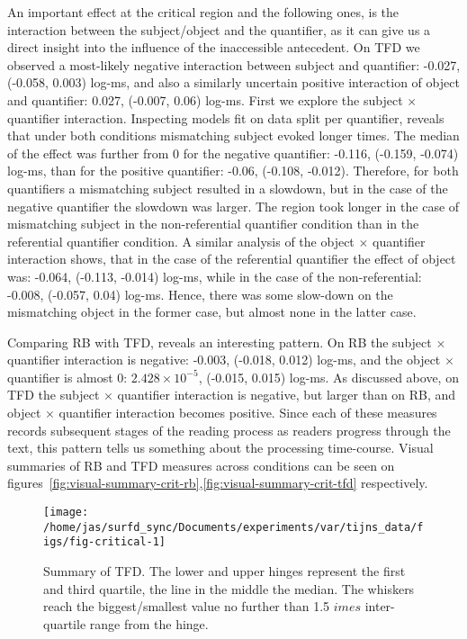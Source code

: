 An important effect at the critical region and the following ones, is the
interaction between the subject/object and the quantifier, as it can give us a direct
insight into the influence of the inaccessible antecedent. On TFD we observed a most-likely negative interaction between subject and quantifier: -0.027, (-0.058, 0.003) log-ms, and also a similarly uncertain positive interaction of object and quantifier: 0.027, (-0.007, 0.06) log-ms.
First we explore the subject $\times$ quantifier interaction. Inspecting models fit on data split per quantifier, reveals that under both conditions mismatching subject evoked longer times.
The median of the effect was further from 0 for the negative quantifier: -0.116, (-0.159, -0.074) log-ms, than for the positive quantifier: -0.06, (-0.108, -0.012).
Therefore, for both quantifiers a mismatching subject resulted in a slowdown, but in the case of the negative quantifier the slowdown was larger.  The region took longer in the case of mismatching subject in the non-referential quantifier condition than in the referential quantifier condition.
A similar analysis of the object $\times$ quantifier interaction shows, that in the case of the referential quantifier the effect of object was: -0.064, (-0.113, -0.014) log-ms, while in the case of the non-referential: -0.008, (-0.057, 0.04) log-ms. Hence, there was some slow-down on the mismatching object in the former case, but almost none in the latter case.


Comparing RB with TFD, reveals an interesting pattern. On RB the subject $\times$ quantifier interaction is negative: -0.003, (-0.018, 0.012) log-ms, and the object $\times$ quantifier is almost 0: \ensuremath{2.428\times 10^{-5}}, (-0.015, 0.015) log-ms.
As discussed above, on TFD the subject $\times$ quantifier interaction is negative, but larger than on RB, and object $\times$ quantifier interaction becomes positive. Since each of these measures records subsequent stages of the reading process as readers progress through the text, this pattern tells us something about the processing time-course.
Visual summaries of RB and TFD measures across conditions can be seen on figures~\ref{fig:visual-summary-crit-rb},\ref{fig:visual-summary-crit-tfd} respectively.

\begin{knitrout}
\color{fgcolor}\begin{figure}
\texttt{[image: /home/jas/surfd\_sync/Documents/experiments/var/tijns\_data/figs/fig-critical-1]} \caption{\label{fig:visual-summary-crit-tfd}Summary of TFD. The lower and upper hinges represent the first and third quartile, the line in the middle the median. The whiskers reach the biggest/smallest value no further than 1.5 $	imes$ inter-quartile range from the hinge.}\label{fig:fig-critical}
\end{figure}

\end{knitrout}

